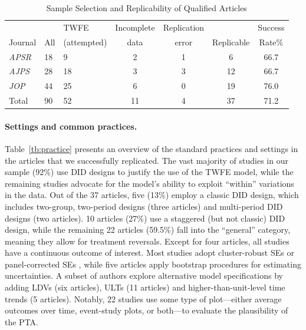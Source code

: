 \documentclass[12pt]{article}
\begin{document}
\begin{table}[!htbp]
  \centering\small
   \caption{Sample Selection and Replicability of Qualified Articles}
    \label{tb:replicability}
   \begin{tabular}{C{1.8cm}C{1.7cm}C{2.2cm}cccc}\hline\hline\small
      &      & TWFE & Incomplete & Replication &  &  Success\\
    Journal  & All &  (attempted)  &  data    &  error  &   Replicable & Rate\% \\\hline
    {\it APSR} &  18 & 9    & 2     & 1     & 6     & 66.7 \\
    {\it AJPS} &  28 & 18    & 3     & 3     & 12     & 66.7 \\
    {\it JOP}  &  44 & 25    & 6     & 0     & 19    & 76.0 \\ \hline
    Total      & 90 & 52    & 11    & 4     & 37    & 71.2 \\\hline
    \end{tabular}%
\end{table}\vspace*{-1em}


 
\paragraph*{Settings and common practices.} Table~\ref{tb:practice} presents an overview of the standard practices and settings in the articles that we successfully replicated. The vast majority of studies in our sample (92\%) use DID designs to justify the use of the TWFE model, while the remaining studies advocate for the model's ability to exploit ``within'' variations in the data. Out of the 37 articles, five (13\%) employ a classic DID design, which includes two-group, two-period designs (three articles) and multi-period DID designs (two articles). 10 articles (27\%) use a staggered (but not classic) DID design, while the remaining 22 articles (59.5\%) fall into the ``general'' category, meaning they allow for treatment reversals. Except for four articles, all studies have a continuous outcome of interest. Most studies adopt cluster-robust SEs or panel-corrected SEs \citep{Beck1995-am}, while five articles apply bootstrap procedures for estimating uncertainties. A subset of authors explore alternative model specifications by adding LDVs (six articles), ULTs (11 articles) and higher-than-unit-level time trends (5 articles). Notably, 22 studies use some type of plot---either average outcomes over time, event-study plots, or both---to evaluate the plausibility of the PTA. 
\end{document}
